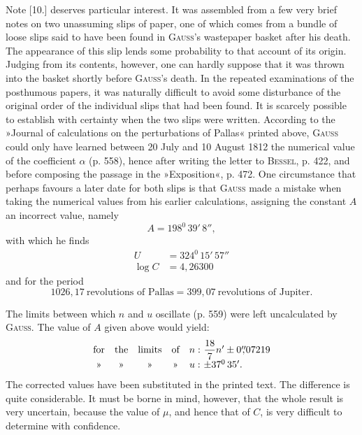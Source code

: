\par\noindent\hspace*{\parindent}Note [10.] deserves particular interest. It was assembled from
a few very brief notes on two unassuming slips of paper,
one of which
comes from a bundle of loose slips said to have been found in \textsc{Gauss}'s wastepaper basket after his death.
The appearance of this slip lends some probability to that account of its origin.
Judging from its contents, however, one can hardly suppose that it was thrown into the basket
shortly before \textsc{Gauss}'s death. In the repeated examinations
of the posthumous papers, it was naturally difficult to avoid some disturbance
of the original order of the individual slips that had been found.
It is scarcely possible to establish with certainty when the two slips were written.
According to the »Journal of calculations on the perturbations of Pallas« printed above,
\textsc{Gauss} could only have learned between 20 July
and 10 August 1812 the numerical value of the coefficient
\(\alpha\) (p. 558), hence after writing the letter to
\textsc{Bessel}, p. 422, and before composing the passage in the »Exposition«, p. 472.
One circumstance that perhaps favours a later date for both slips is that
\textsc{Gauss} made a mistake when taking the numerical values from his
earlier calculations, assigning the constant \(A\) an incorrect value,
namely
\[
A=198^0\,39'\,8'',
\]
\noindent with which he finds
\[
\begin{aligned}
U&=324^0\,15'\,57''\\
\log C&=4{,}26300
\end{aligned}
\]
\noindent and for the period
\[
1026{,}17\ \text{revolutions of Pallas}=399{,}07\ \text{revolutions of Jupiter}.
\]

\par\noindent\hspace*{\parindent}The limits between which \(n\) and \(u\) oscillate (p. 559) were left uncalculated by
\textsc{Gauss}. The value of \(A\) given above would yield:
\[
\begin{array}{ccccc@{\ }l}
\text{for}&\text{the}&\text{limits}&\text{of}&n:&\dfrac{18}{7}n'\pm0\overset{\prime\prime}{,}07219\\[3pt]
\text{»}&\text{»}&\text{»}&\text{»}&u:&\pm37^0\,35'.
\end{array}
\]
\noindent The corrected values have been substituted in the printed text. The difference
is quite considerable. It must be borne in mind, however, that the whole result is very
uncertain, because the value of \(\mu\), and hence that of \(C\), is very difficult to determine with confidence.


